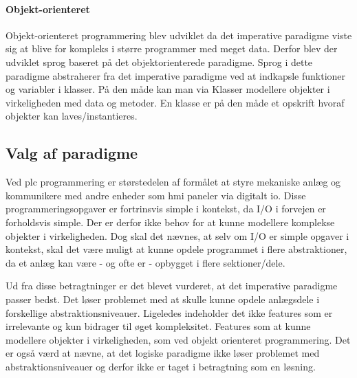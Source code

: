 \paragraph{Objekt-orienteret}
Objekt-orienteret programmering blev udviklet da det imperative paradigme viste sig at blive for kompleks i større programmer med meget data. Derfor blev der udviklet sprog baseret på det objektorienterede paradigme. Sprog i dette paradigme abstraherer fra det imperative paradigme ved at indkapsle funktioner og variabler i klasser. På den måde kan man via Klasser modellere objekter i virkeligheden med data og metoder. En klasse er på den måde et opskrift hvoraf objekter kan laves/instantieres.

\subsection{Valg af paradigme}\label{ssec:paradigmevalg}
Ved \gls{plc} programmering er størstedelen af formålet at styre mekaniske anlæg og kommunikere med andre enheder som \gls{hmi} paneler via digitalt \gls{io}. Disse programmeringsopgaver er fortrinsvis simple i kontekst, da I/O i forvejen er forholdsvis simple. Der er derfor ikke behov for at kunne modellere komplekse objekter i virkeligheden. Dog skal det nævnes, at selv om I/O er simple opgaver i kontekst, skal det være muligt at kunne opdele programmet i flere abstraktioner, da et anlæg kan være - og ofte er - opbygget i flere sektioner/dele.

Ud fra disse betragtninger er det blevet vurderet, at det imperative paradigme passer bedst. Det løser problemet med at skulle kunne opdele anlægsdele i forskellige abstraktionsniveauer. Ligeledes indeholder det ikke features som er irrelevante og kun bidrager til øget kompleksitet. Features som at kunne modellere objekter i virkeligheden, som ved objekt orienteret programmering. Det er også værd at nævne, at det logiske paradigme ikke løser problemet med abstraktionsniveauer og derfor ikke er taget i betragtning som en løsning.